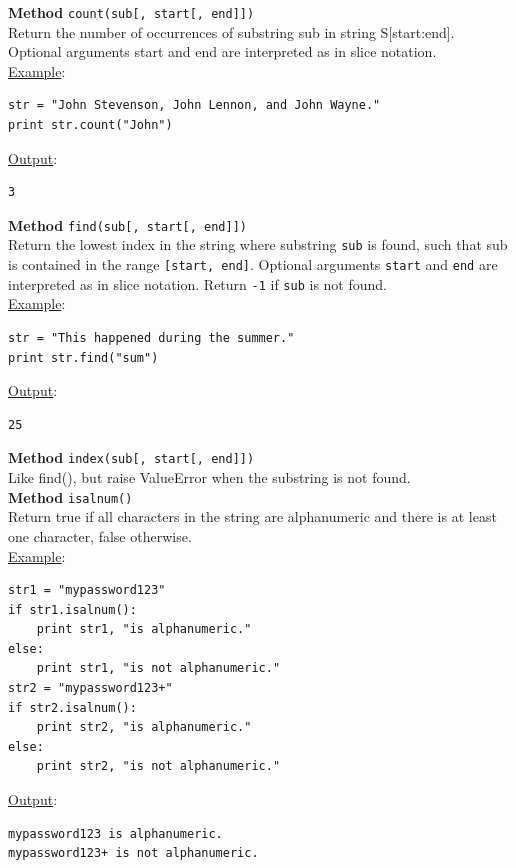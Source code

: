 \noindent
{\bf Method} {\tt count(sub[, start[, end]])}\\

\noindent
Return the number of occurrences of substring sub in string S[start:end]. 
Optional arguments start and end are interpreted as in slice notation.\\

\noindent
\underline{Example}:
\begin{verbatim}
str = "John Stevenson, John Lennon, and John Wayne."
print str.count("John")
\end{verbatim}
\underline{Output}:
\begin{verbatim}
3
\end{verbatim}
\vspace{4mm}

\noindent
{\bf Method} {\tt find(sub[, start[, end]])}\\

\noindent
Return the lowest index in the string where substring {\tt sub} is found, such that 
sub is contained in the range {\tt [start, end]}. Optional arguments {\tt start} and {\tt end} 
are interpreted as in slice notation. Return {\tt -1} if {\tt sub} is not found.\\

\noindent
\underline{Example}:
\begin{verbatim}
str = "This happened during the summer."
print str.find("sum")
\end{verbatim}
\underline{Output}:
\begin{verbatim}
25
\end{verbatim}
\vspace{4mm}

\noindent
{\bf Method} {\tt index(sub[, start[, end]])}\\

\noindent
Like find(), but raise ValueError when the substring is not found.\\

\noindent
{\bf Method} {\tt isalnum()}\\

\noindent
Return true if all characters in the string are alphanumeric and 
there is at least one character, false otherwise.\\

\noindent
\underline{Example}:
\begin{verbatim}
str1 = "mypassword123"
if str1.isalnum():
    print str1, "is alphanumeric."
else: 
    print str1, "is not alphanumeric."
str2 = "mypassword123+"
if str2.isalnum():
    print str2, "is alphanumeric."
else: 
    print str2, "is not alphanumeric."
\end{verbatim}
\underline{Output}:
\begin{verbatim}
mypassword123 is alphanumeric.
mypassword123+ is not alphanumeric.
\end{verbatim}
\vspace{4mm}

